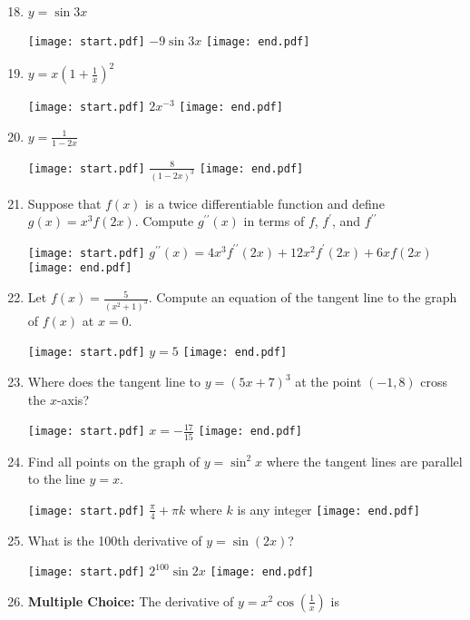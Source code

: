 \documentclass[12pt]{article}
\begin{document}
\begin{enumerate}
\setcounter{enumi}{17}

\item $y = \sin{3x}$ 

\texttt{[image: start.pdf]}
{{$-9\sin{3x}$}}
\texttt{[image: end.pdf]}


\item $y = x\left(1+\frac{1}{x}\right)^2$ 

\texttt{[image: start.pdf]}
{{$2x^{-3}$}}
\texttt{[image: end.pdf]}


\item $y = \frac{1}{1-2x}$ 

\texttt{[image: start.pdf]}
{{$\frac{8}{(1-2x)^3}$}}
\texttt{[image: end.pdf]}


\item  Suppose that $f(x)$ is a twice differentiable function and define $g(x)=x^3f(2x)$.  Compute $g^{\prime \prime}(x)$ in terms of $f$, $f^{\prime}$, and $f^{\prime \prime}$

\texttt{[image: start.pdf]}
{{$g^{\prime \prime}(x)=4x^3f^{\prime \prime}(2x)+12x^2f^{\prime}(2x)+6xf(2x)$}}
\texttt{[image: end.pdf]}


\item Let $f(x)=\frac{5}{(x^2+1)^3}$.  Compute an equation of the tangent line to the graph of $f(x)$ at $x=0$.

\texttt{[image: start.pdf]}
{{$y=5$}}
\texttt{[image: end.pdf]}


\item Where does the tangent line to $y=(5x+7)^3$ at the point $(-1,8)$ cross the $x$-axis?

\texttt{[image: start.pdf]}
{{$x=-\frac{17}{15}$}}
\texttt{[image: end.pdf]}


\item Find all points on the graph of $y=\sin^2{x}$ where the tangent lines are parallel to the line $y=x$.

\texttt{[image: start.pdf]}
{{$\frac{\pi}{4}+\pi k$ where $k$ is any integer}}
\texttt{[image: end.pdf]}


\item What is the 100th derivative of $y=\sin{(2x)}$?

\texttt{[image: start.pdf]}
{{$2^{100}\sin{2x}$}}
\texttt{[image: end.pdf]}


\item {\bf Multiple Choice:} The derivative of $y=x^2\cos{\left(\frac{1}{x}\right)}$ is


\end{enumerate}
\end{document}
